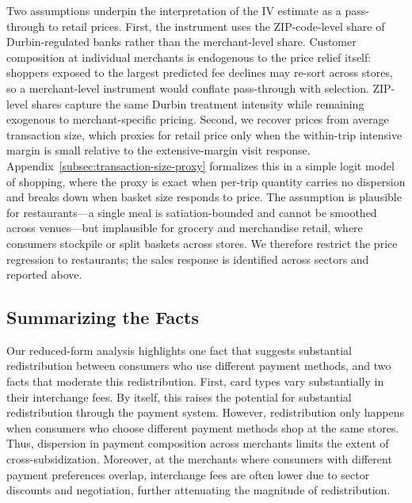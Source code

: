 \documentclass[main.tex]{subfiles}
\begin{document}
Two assumptions underpin the interpretation of the IV estimate as a pass-through to retail prices.
First, the instrument uses the ZIP-code-level share of Durbin-regulated banks rather than the merchant-level share.
Customer composition at individual merchants is endogenous to the price relief itself: shoppers exposed to the largest predicted fee declines may re-sort across stores, so a merchant-level instrument would conflate pass-through with selection.
ZIP-level shares capture the same Durbin treatment intensity while remaining exogenous to merchant-specific pricing.
Second, we recover prices from average transaction size, which proxies for retail price only when the within-trip intensive margin is small relative to the extensive-margin visit response.
Appendix~\ref{subsec:transaction-size-proxy} formalizes this in a simple logit model of shopping, where the proxy is exact when per-trip quantity carries no dispersion and breaks down when basket size responds to price.
The assumption is plausible for restaurants---a single meal is satiation-bounded and cannot be smoothed across venues---but implausible for grocery and merchandise retail, where consumers stockpile or split baskets across stores.
We therefore restrict the price regression to restaurants; the sales response is identified across sectors and reported above.


\subsection{Summarizing the Facts}

Our reduced-form analysis highlights one fact that suggests substantial redistribution between consumers who use different payment methods, and two facts that moderate this redistribution. First, card types vary substantially in their interchange fees. By itself, this raises the potential for substantial redistribution through the payment system. However, redistribution only happens when consumers who choose different payment methods shop at the same stores. Thus, dispersion in payment composition across merchants limits the extent of cross-subsidization. Moreover, at the merchants where consumers with different payment preferences overlap, interchange fees are often lower due to sector discounts and negotiation, further attenuating the magnitude of redistribution.
\end{document}
